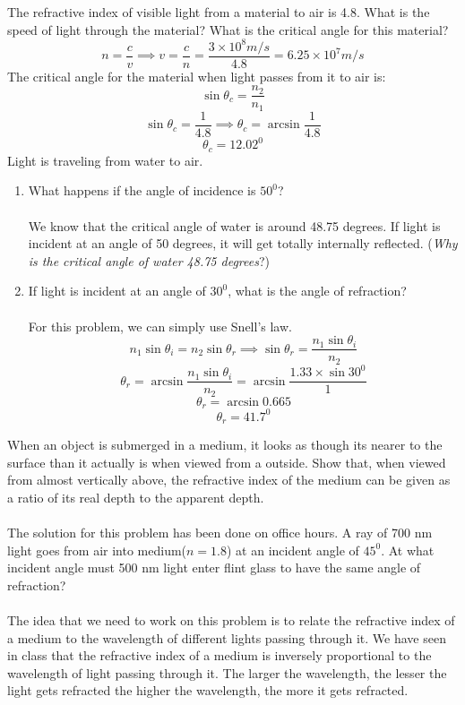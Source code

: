 \documentclass[11pt,addpoints]{exam}
\begin{document}
	\begin{questions}
		\question The refractive index of visible light from a material to air is 4.8. What is the speed of light through the material? What is the critical angle for this material?
		$$n=\dfrac{c}{v}\implies v=\dfrac{c}{n}=\dfrac{3\times10^8m/s}{4.8}=6.25\times10^{7}m/s$$
		The critical angle for the material when light passes from it to air is:
		$$\sin\theta_c=\dfrac{n_2}{n_1}$$
		$$\sin\theta_c=\dfrac{1}{4.8}\implies\theta_c=\arcsin\dfrac{1}{4.8}$$
		$$\theta_c=12.02^0$$
		\question Light is traveling from water to air.
		\begin{enumerate}[label=(\alph*)]
			\item What happens if the angle of incidence is $50^0$? \\ \\
			We know that the critical angle of water is around 48.75 degrees. If light is incident at an angle of 50 degrees, it will get totally internally reflected. (\textit{Why is the critical angle of water 48.75 degrees}?) \\
			\item If light is incident at an angle of $30^0$, what is the angle of refraction? \\ \\
			For this problem, we can simply use Snell's law.
			$$n_1\sin\theta_i=n_2\sin\theta_r\implies\sin\theta_r=\dfrac{n_1\sin\theta_i}{n_2}$$
			$$\theta_r=\arcsin\dfrac{n_1\sin\theta_i}{n_2}=\arcsin\dfrac{1.33\times\sin30^0}{1}$$
			$$\theta_r=\arcsin0.665$$
			$$\theta_r=41.7^0$$
		\end{enumerate}
		\question When an object is submerged in a medium, it looks as though its nearer to the surface than it actually is when viewed from a outside. Show that, when viewed from almost vertically above, the refractive index of the medium can be given as a ratio of its real depth to the apparent depth. \\ \\
		The solution for this problem has been done on office hours.
		\question A ray of 700 nm light goes from air into medium($n=1.8$) at an incident angle of $45^0$. At what incident angle must 500 nm light enter flint glass to have the same angle of refraction? \\ \\
		The idea that we need to work on this problem is to relate the refractive index of a medium to the wavelength of different lights passing through it. We have seen in class that the refractive index of a medium is inversely proportional to the wavelength of light passing through it. The larger the wavelength, the lesser the light gets refracted the higher the wavelength, the more it gets refracted.

\end{questions}
\end{document}
